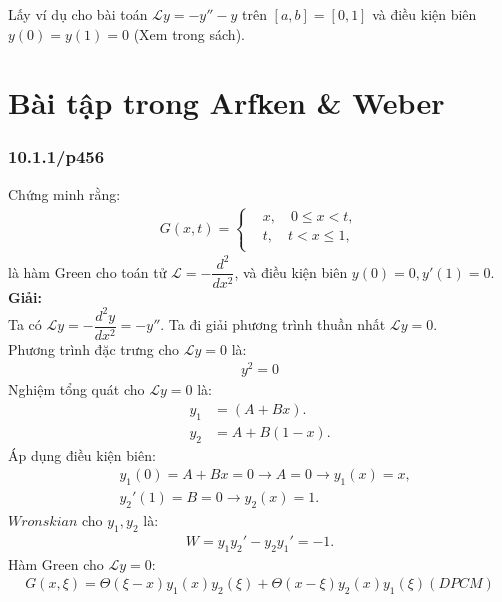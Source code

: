 \documentclass{report}
\begin{document}
Lấy ví dụ cho bài toán $\mathcal{L} y = -y'' - y$ trên $\left[a,b\right] = \left[0,1\right]$ và điều kiện biên $y(0) = y(1) = 0$ (Xem trong sách).

\newpage

\section{Bài tập trong Arfken \& Weber}


\subsubsection{10.1.1/p456}
Chứng minh rằng:
\begin{align*}
	G(x,t) =
	\begin{cases}
		 & x , \quad 0 \leq x < t, \\
		 & t , \quad t < x\leq 1 , \\
	\end{cases}
\end{align*}
là hàm Green cho toán tử $\mathcal{L} = -\dfrac{d^2}{dx^2}$, và điều kiện biên $y(0) = 0, y'(1) = 0$.\\

\textbf{Giải:}\\
Ta có $\mathcal{L} y = -\dfrac{d^2 y}{dx^2}  = -y''$. Ta đi giải phương trình thuần nhất $\mathcal{L} y = 0$.\\
Phương trình đặc trưng cho $\mathcal{L} y = 0$ là:
\begin{align*}
	y^2 = 0
\end{align*}
Nghiệm tổng quát cho $\mathcal{L} y = 0$ là:
\begin{align*}
	y_1 & = (A + Bx).   \\
	y_2 & = A + B(1-x).
\end{align*}
Áp dụng điều kiện biên:
\begin{align*}
	 & y_1(0) = A + Bx = 0 \rightarrow A = 0 \rightarrow y_1(x) = x, \\
	 & y_{2}{'}(1) = B = 0 \rightarrow y_2(x) = 1.
\end{align*}
$Wronskian$ cho $y_1,y_2$ là:
\begin{align*}
	W = y_{1} y_{2}' - y_{2} y_{1}' = -1.
\end{align*}
Hàm Green cho $\mathcal{L} y = 0$:
\begin{align*}
	G(x,\xi)  = \Theta(\xi - x) y_1(x)y_2(\xi) + \Theta(x - \xi) y_2(x)y_1(\xi) (DPCM)
\end{align*}
\end{document}
